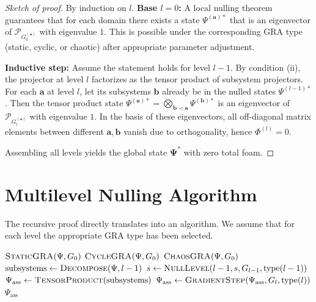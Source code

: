 \documentclass[12pt,a4paper]{article}
\newcommand{\pG}{\mathcal{P}_{G}}
\begin{document}
\begin{proof}[Sketch of proof]
By induction on $l$.
\textbf{Base $l=0$:} A local nulling theorem guarantees that for each domain there exists a state $\Psi^{(\mathbf{a})*}$ that is an eigenvector of $\pG_0^{(\mathbf{a})}$ with eigenvalue $1$. This is possible under the corresponding GRA type (static, cyclic, or chaotic) after appropriate parameter adjustment.

\textbf{Inductive step:} Assume the statement holds for level $l-1$. By condition (ii), the projector at level $l$ factorizes as the tensor product of subsystem projectors. For each $\mathbf{a}$ at level $l$, let its subsystems $\mathbf{b}$ already be in the nulled states $\Psi^{(l-1)*}$. Then the tensor product state $\Psi^{(\mathbf{a})*} = \bigotimes_{\mathbf{b}\prec\mathbf{a}} \Psi^{(\mathbf{b})*}$ is an eigenvector of $\pG_l^{(\mathbf{a})}$ with eigenvalue $1$. In the basis of these eigenvectors, all off-diagonal matrix elements between different $\mathbf{a},\mathbf{b}$ vanish due to orthogonality, hence $\Phi^{(l)}=0$.

Assembling all levels yields the global state $\mathbf{\Psi}^*$ with zero total foam.
\end{proof}

\section{Multilevel Nulling Algorithm}
The recursive proof directly translates into an algorithm. We assume that for each level the appropriate GRA type has been selected.

\begin{algorithm}
\caption{Multiverse GRA Nulling}
\begin{algorithmic}[1]
     \Return $\textsc{StaticGRA}(\Psi, G_0)$
     \Return $\textsc{CycleGRA}(\Psi, G_0)$
     \Return $\textsc{ChaosGRA}(\Psi, G_0)$
    \EndIf
\Else
    \State $\text{subsystems} \gets \textsc{Decompose}(\Psi, l-1)$
        \State $s \gets \textsc{NullLevel}(l-1, s, G_{l-1}, \text{type}(l-1))$
    \EndFor
    \State $\Psi_{\text{ass}} \gets \textsc{TensorProduct}(\text{subsystems})$
        \State $\Psi_{\text{ass}} \gets \textsc{GradientStep}(\Psi_{\text{ass}}, G_l, \text{type}(l))$
    \EndWhile
    \State \Return $\Psi_{\text{ass}}$
\EndIf
\EndFunction
\end{algorithmic}
\end{algorithm}
\end{document}
